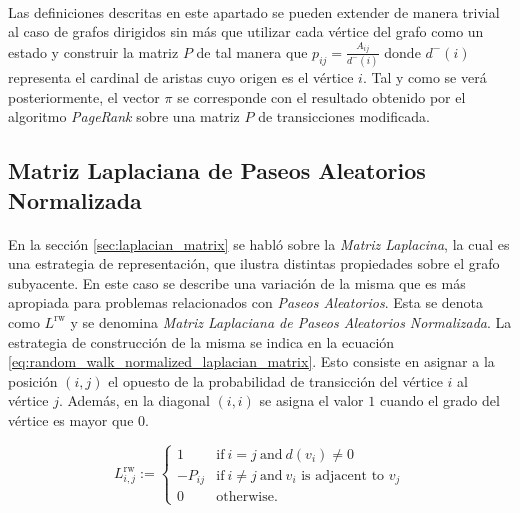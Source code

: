 \documentclass{subfiles}
\begin{document}
        \paragraph{}
        Las definiciones descritas en este apartado se pueden extender de manera trivial al caso de grafos dirigidos sin más que utilizar cada vértice del grafo como un estado y construir la matriz $P$ de tal manera que $p_{ij}=\frac{A_{ij}}{d^-(i)}$ donde $d^-(i)$ representa el cardinal de aristas cuyo origen es el vértice $i$. Tal y como se verá posteriormente, el vector $\pi$ se corresponde con el resultado obtenido por el algoritmo \emph{PageRank} sobre una matriz $P$ de transicciones modificada.

      \subsection{Matriz Laplaciana de Paseos Aleatorios Normalizada}
      \label{sec:random_walk_normalized_laplacian_matrix}

        \paragraph{}
        En la sección \ref{sec:laplacian_matrix} se habló sobre la \emph{Matriz Laplacina}, la cual es una estrategia de representación, que ilustra distintas propiedades sobre el grafo subyacente. En este caso se describe una variación de la misma que es más apropiada para problemas relacionados con \emph{Paseos Aleatorios}. Esta se denota como $L^{{{\text{rw}}}}$ y se denomina \emph{Matriz Laplaciana de Paseos Aleatorios Normalizada}. La estrategia de construcción de la misma se indica en la ecuación \eqref{eq:random_walk_normalized_laplacian_matrix}. Esto consiste en asignar a la posición $(i,j)$ el opuesto de la probabilidad de transicción del vértice $i$ al vértice $j$. Además, en la diagonal $(i,i)$ se asigna el valor $1$ cuando el grado del vértice es mayor que $0$.

        \begin{equation}
        \label{eq:random_walk_normalized_laplacian_matrix}
          L_{{i,j}}^{{{\text{rw}}}}:={
          \begin{cases}
            1&{\mbox{if}}\ i=j\ {\mbox{and}}\ d(v_{i})\neq 0\\
            -{P_{ij}}&{\mbox{if}}\ i\neq j\ {\mbox{and}}\ v_{i}{\mbox{ is adjacent to }}v_{j}\\
            0&{\mbox{otherwise}}.
          \end{cases}}
        \end{equation}
\end{document}
